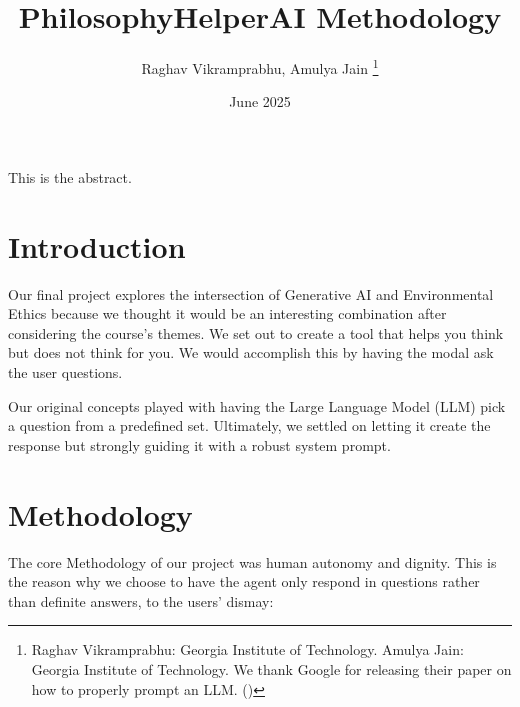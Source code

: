 \documentclass[letterpaper,11pt,leqno]{article}
\begin{document}
\title{PhilosophyHelperAI Methodology}

\author{Raghav Vikramprabhu, Amulya Jain
%
\thanks{Raghav Vikramprabhu: Georgia Institute of Technology. Amulya Jain: Georgia Institute of Technology. We thank Google for releasing their paper on how to properly prompt an LLM. (\cite{PromptEngineering}) }}

\date{June 2025}   


\begin{titlepage}
\maketitle

This is the abstract. 

\end{titlepage}


\section{Introduction}\label{s:introduction}
 
Our final project explores the intersection of Generative AI and Environmental Ethics because we thought it would be an interesting combination after considering the course's themes. We set out to create a tool that helps you think but does not think for you. We would accomplish this by having the modal ask the user questions. 

Our original concepts played with having the Large Language Model (LLM) pick a question from a predefined set. Ultimately, we settled on letting it create the response but strongly guiding it with a robust system prompt.

\section{Methodology}\label{s:section}

The core Methodology of our project was human autonomy and dignity.
This is the reason why we choose to have the agent only respond in questions rather than definite answers, to the users' dismay:
\end{document}
